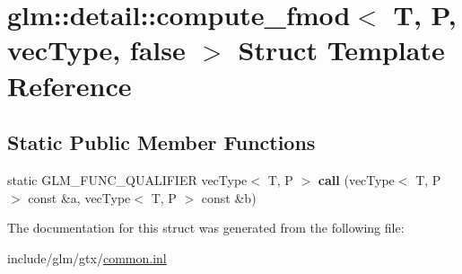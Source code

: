 \hypertarget{structglm_1_1detail_1_1compute__fmod_3_01T_00_01P_00_01vecType_00_01false_01_4}{}\section{glm\+:\+:detail\+:\+:compute\+\_\+fmod$<$ T, P, vec\+Type, false $>$ Struct Template Reference}
\label{structglm_1_1detail_1_1compute__fmod_3_01T_00_01P_00_01vecType_00_01false_01_4}
\subsection*{Static Public Member Functions}
\begin{DoxyCompactItemize}
\item 
\mbox{\label{structglm_1_1detail_1_1compute__fmod_3_01T_00_01P_00_01vecType_00_01false_01_4_aba714e77ed7c4a97b9978c1c09fd6472}} 
static G\+L\+M\+\_\+\+F\+U\+N\+C\+\_\+\+Q\+U\+A\+L\+I\+F\+I\+ER vec\+Type$<$ T, P $>$ {\bfseries call} (vec\+Type$<$ T, P $>$ const \&a, vec\+Type$<$ T, P $>$ const \&b)
\end{DoxyCompactItemize}


The documentation for this struct was generated from the following file\+:\begin{DoxyCompactItemize}
\item 
include/glm/gtx/\hyperlink{common_8inl}{common.\+inl}\end{DoxyCompactItemize}
